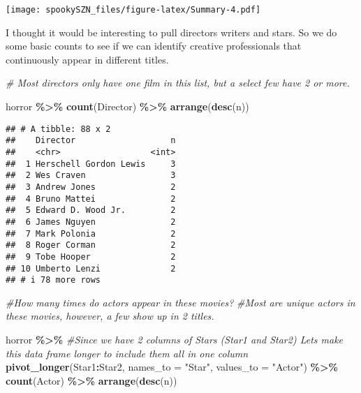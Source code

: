 \documentclass[
]{article}
\newenvironment{Shaded}{\begin{snugshade}}{\end{snugshade}}
\newcommand{\AttributeTok}[1]{\textcolor[rgb]{0.13,0.29,0.53}{#1}}
\newcommand{\CommentTok}[1]{\textcolor[rgb]{0.56,0.35,0.01}{\textit{#1}}}
\newcommand{\FunctionTok}[1]{\textcolor[rgb]{0.13,0.29,0.53}{\textbf{#1}}}
\newcommand{\NormalTok}[1]{#1}
\newcommand{\SpecialCharTok}[1]{\textcolor[rgb]{0.81,0.36,0.00}{\textbf{#1}}}
\newcommand{\StringTok}[1]{\textcolor[rgb]{0.31,0.60,0.02}{#1}}
\begin{document}
\texttt{[image: spookySZN\_files/figure-latex/Summary-4.pdf]}

I thought it would be interesting to pull directors writers and stars.
So we do some basic counts to see if we can identify creative
professionals that continuously appear in different titles.

\begin{Shaded}
\begin{Highlighting}[]
\CommentTok{\# Most directors only have one film in this list, but a select few have 2 or more.}

\NormalTok{horror }\SpecialCharTok{\%\textgreater{}\%} 
  \FunctionTok{count}\NormalTok{(Director) }\SpecialCharTok{\%\textgreater{}\%}
  \FunctionTok{arrange}\NormalTok{(}\FunctionTok{desc}\NormalTok{(n))}
\end{Highlighting}
\end{Shaded}

\begin{verbatim}
## # A tibble: 88 x 2
##    Director                   n
##    <chr>                  <int>
##  1 Herschell Gordon Lewis     3
##  2 Wes Craven                 3
##  3 Andrew Jones               2
##  4 Bruno Mattei               2
##  5 Edward D. Wood Jr.         2
##  6 James Nguyen               2
##  7 Mark Polonia               2
##  8 Roger Corman               2
##  9 Tobe Hooper                2
## 10 Umberto Lenzi              2
## # i 78 more rows
\end{verbatim}

\begin{Shaded}
\begin{Highlighting}[]
\CommentTok{\#How many times do actors appear in these movies? }
\CommentTok{\#Most are unique actors in these movies, however, a few show up in 2 titles. }

\NormalTok{horror }\SpecialCharTok{\%\textgreater{}\%} 
  \CommentTok{\#Since we have 2 columns of Stars (Star1 and Star2) Let\textquotesingle{}s make this data frame longer to include them all in one column }
  \FunctionTok{pivot\_longer}\NormalTok{(Star1}\SpecialCharTok{:}\NormalTok{Star2, }\AttributeTok{names\_to =} \StringTok{"Star"}\NormalTok{, }\AttributeTok{values\_to =} \StringTok{"Actor"}\NormalTok{) }\SpecialCharTok{\%\textgreater{}\%} 
  \FunctionTok{count}\NormalTok{(Actor) }\SpecialCharTok{\%\textgreater{}\%} 
  \FunctionTok{arrange}\NormalTok{(}\FunctionTok{desc}\NormalTok{(n))}
\end{Highlighting}
\end{Shaded}
\end{document}
